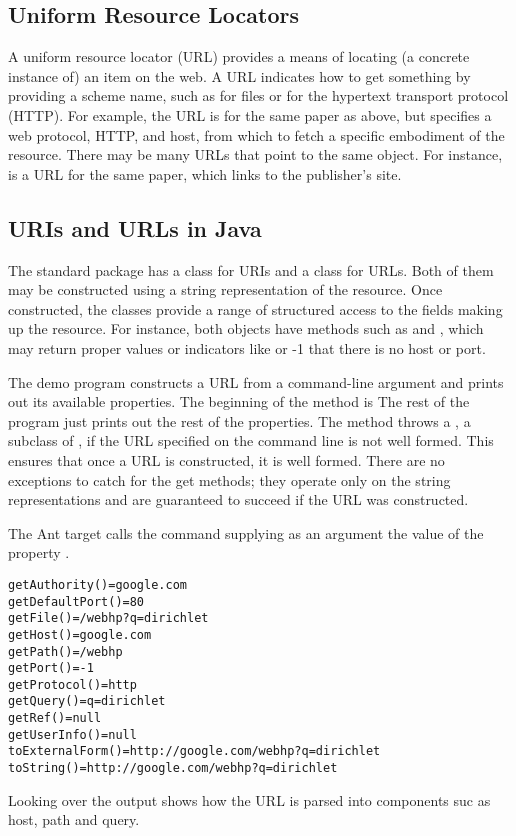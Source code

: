 \subsection{Uniform Resource Locators}

A uniform resource locator (URL) provides a means of locating (a
concrete instance of) an item on the web.  A URL indicates how to get
something by providing a scheme name, such as  for files
or  for the hypertext transport protocol (HTTP).  For
example, the URL
 is for the same
paper as above, but specifies a web protocol, HTTP, and host,
 from which to fetch a specific embodiment of
the resource.  There may be many URLs that point to the same object.
For instance, 
is a URL for the same paper, which links to the publisher's site.

\subsection{URIs and URLs in Java}

The standard  package has a class  for URIs
and a class  for URLs.  Both of them may be constructed
using a string representation of the resource.  Once constructed, the
classes provide a range of structured access to the fields making up
the resource.  For instance, both objects have methods such as
 and , which may return proper values
or indicators like  or -1 that there is no host or port.

The demo program  constructs a URL from a
command-line argument and prints out its available properties.  The
beginning of the  method is
%
%
The rest of the program just prints out the rest of the properties.
The  method throws a , a
subclass of , if the URL specified on the command
line is not well formed.  This ensures that once a URL is constructed,
it is well formed.  There are no exceptions to catch for the get
methods; they operate only on the string representations and are
guaranteed to succeed if the URL was constructed.

The Ant target  calls the command supplying as
an argument the value of the property .
%
\begin{verbatim}
getAuthority()=google.com
getDefaultPort()=80
getFile()=/webhp?q=dirichlet
getHost()=google.com
getPath()=/webhp
getPort()=-1
getProtocol()=http
getQuery()=q=dirichlet
getRef()=null
getUserInfo()=null
toExternalForm()=http://google.com/webhp?q=dirichlet
toString()=http://google.com/webhp?q=dirichlet
\end{verbatim}
%
Looking over the output shows how the URL is parsed into components
suc as host, path and query.

